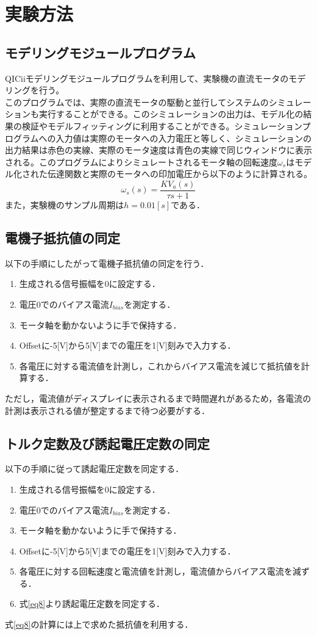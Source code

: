 \documentclass[11pt,a4paper]{jsarticle}
\begin{document}
  \newpage
  
 \section{実験方法}
  \subsection{モデリングモジュールプログラム}
  QICiiモデリングモジュールプログラムを利用して、実験機の直流モータのモデリングを行う。\\
  このプログラムでは、実際の直流モータの駆動と並行してシステムのシミュレーションも実行することができる。このシミュレーションの出力は、モデル化の結果の検証やモデルフィッティングに利用することができる。シミュレーションプログラムへの入力値は実際のモータへの入力電圧と等しく、シミュレーションの出力結果は赤色の実線、実際のモータ速度は青色の実線で同じウィンドウに表示される。このプログラムによりシミュレートされるモータ軸の回転速度$\omega_s$はモデル化された伝達関数と実際のモータへの印加電圧から以下のように計算される。
  \begin{equation}
   \omega_s(s) = \frac{KV_a(s)}{\tau s+1}
    \label{eq14}
  \end{equation}
  また，実験機のサンプル周期は$h = 0.01[s]$である．
  \subsection{電機子抵抗値の同定}
  以下の手順にしたがって電機子抵抗値の同定を行う．
  \begin{enumerate}
   \item 生成される信号振幅を0に設定する．
   \item 電圧0でのバイアス電流$I_{bias}$を測定する．
   \item モータ軸を動かないように手で保持する．
   \item Offsetに-5[V]から5[V]までの電圧を1[V]刻みで入力する．
   \item 各電圧に対する電流値を計測し，これからバイアス電流を減じて抵抗値を計算する．
  \end{enumerate}
  ただし，電流値がディスプレイに表示されるまで時間遅れがあるため，各電流の計測は表示される値が整定するまで待つ必要がする．
  \subsection{トルク定数及び誘起電圧定数の同定}
  以下の手順に従って誘起電圧定数を同定する．
  \begin{enumerate}
   \item 生成される信号振幅を0に設定する．
   \item 電圧0でのバイアス電流$I_{bias}$を測定する．
   \item モータ軸を動かないように手で保持する．
   \item Offsetに-5[V]から5[V]までの電圧を1[V]刻みで入力する．
   \item 各電圧に対する回転速度と電流値を計測し，電流値からバイアス電流を減ずる．
   \item 式\ref{eq8}より誘起電圧定数を同定する．
  \end{enumerate}
  式\ref{eq8}の計算には上で求めた抵抗値を利用する．
\end{document}
